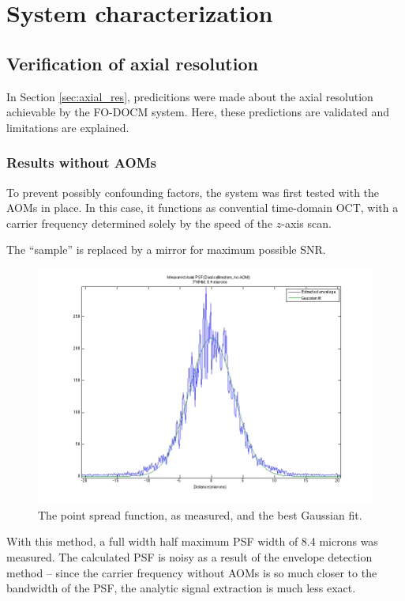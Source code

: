 \chapter{System characterization}

\section{Verification of axial resolution}

In Section \ref{sec:axial_res}, predicitions were made about the axial resolution achievable by the FO-DOCM system. Here, these predictions are validated and limitations are explained.

\subsection{Results without AOMs}

To prevent possibly confounding factors, the system was first tested with the AOMs in place. In this case, it functions as convential time-domain OCT, with a carrier frequency determined solely by the speed of the $z$-axis scan.

The ``sample'' is replaced by a mirror for maximum possible SNR.

\begin{figure}[h!]
\centering
\includegraphics[width=1.0\textwidth]{Images/Results/psf-noaom.png}
\caption{The point spread function, as measured, and the best Gaussian fit.}
\end{figure}

With this method, a full width half maximum PSF width of 8.4 microns was measured. The calculated PSF is noisy as a result of the envelope detection method -- since the carrier frequency without AOMs is so much closer to the bandwidth of the PSF, the analytic signal extraction is much less exact.


